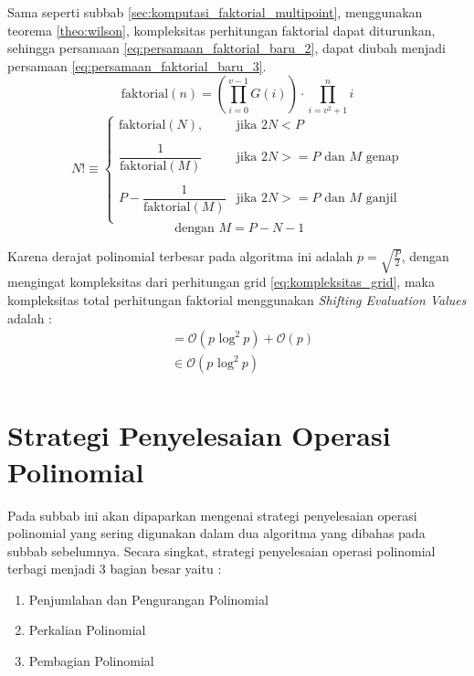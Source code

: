 Sama seperti subbab \ref{sec:komputasi_faktorial_multipoint}, menggunakan teorema \ref{theo:wilson}, kompleksitas perhitungan faktorial dapat diturunkan, sehingga persamaan \eqref{eq:persamaan_faktorial_baru_2}, dapat diubah menjadi persamaan \eqref{eq:persamaan_faktorial_baru_3}.
$$ \text{faktorial}(n) = \left( \prod_{i=0}^{v-1} G(i) \right) \cdot \prod_{i=v^2+1}^n i $$
\begin{equation}
	N! \equiv
	\begin{cases}
		\text{faktorial}(N), 	      & \text{jika } 2N < P \\\\
		\dfrac{1}{\text{faktorial}(M)}
		& \text{jika } 2N >= P \text{ dan } M \text{ genap}\\\\
		P -\dfrac{1}{\text{faktorial}(M)}
		& \text{jika } 2N >= P \text{ dan } M \text{ ganjil} \\
	\end{cases}
	\label{eq:persamaan_faktorial_baru_3}
\end{equation}
$$ \text{ dengan } M = P-N-1 $$

Karena derajat polinomial terbesar pada algoritma ini adalah $ p = \sqrt{\frac{P}{2}} $, dengan mengingat kompleksitas dari perhitungan grid \eqref{eq:kompleksitas_grid}, maka kompleksitas total perhitungan faktorial menggunakan \textit{Shifting Evaluation Values} adalah :
\begin{equation}
	\begin{aligned}
		&= \mathcal{O}{(p \text{ log}^2\ p)} + \mathcal{O}{(p)} \\
		&\in \mathcal{O}{(p \text{ log}^2\ p)} \\
	\end{aligned}
	\label{eq:kompleksitas_shifting_eval_faktorial}
\end{equation}

\section{ Strategi Penyelesaian Operasi Polinomial}
Pada subbab ini akan dipaparkan mengenai strategi penyelesaian operasi polinomial yang sering digunakan dalam dua algoritma yang dibahas pada subbab sebelumnya. Secara singkat, strategi penyelesaian operasi polinomial terbagi menjadi 3 bagian besar yaitu :
\begin{enumerate}
	\item Penjumlahan dan Pengurangan Polinomial
	\item Perkalian Polinomial
	\item Pembagian Polinomial
\end{enumerate}

